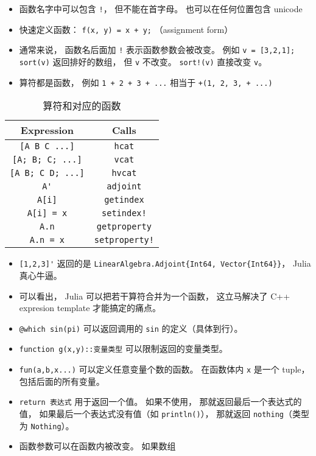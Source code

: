 
\begin{issues}
\issueDraft
\end{issues}

\begin{itemize}
\item 函数名字中可以包含 \verb`!`， 但不能在首字母。 也可以在任何位置包含 unicode
\item 快速定义函数： \verb`f(x, y) = x + y;` （assignment form）
\item 通常来说， 函数名后面加 \verb`!` 表示函数参数会被改变。 例如 \verb`v = [3,2,1]; sort(v)` 返回排好的数组， 但 \verb`v` 不改变。 \verb`sort!(v)` 直接改变 \verb`v`。
\item 算符都是函数， 例如 \verb`1 + 2 + 3 + ...` 相当于 \verb`+(1, 2, 3, + ...)`
\end{itemize}


\begin{table}[ht]
\centering
\caption{算符和对应的函数}\label{tab_JuFunc_1}
\begin{tabular}{|c|c|}
\hline
Expression & Calls \\
\hline
\verb`[A B C ...]` & \verb`hcat` \\
\hline
\verb`[A; B; C; ...]` & \verb`vcat` \\
\hline
\verb`[A B; C D; ...]` & \verb`hvcat` \\
\hline
\verb`A'` & \verb`adjoint` \\
\hline
\verb`A[i]` & \verb`getindex` \\
\hline
\verb`A[i] = x` & \verb`setindex!` \\
\hline
\verb`A.n` & \verb`getproperty` \\
\hline
\verb`A.n = x` & \verb`setproperty!` \\
\hline
\end{tabular}
\end{table}

\begin{itemize}
\item \verb`[1,2,3]'` 返回的是 \verb`LinearAlgebra.Adjoint{Int64, Vector{Int64}}`， Julia 真心牛逼。
\item 可以看出， Julia 可以把若干算符合并为一个函数， 这立马解决了 C++ expresion template 才能搞定的痛点。
\item \verb`@which sin(pi)` 可以返回调用的 \verb`sin` 的定义（具体到行）。
\item \verb`function g(x,y)::变量类型` 可以限制返回的变量类型。
\item \verb`fun(a,b,x...)` 可以定义任意变量个数的函数。 在函数体内 \verb`x` 是一个 tuple， 包括后面的所有变量。
\item \verb`return 表达式` 用于返回一个值。 如果不使用， 那就返回最后一个表达式的值， 如果最后一个表达式没有值（如 \verb`println()`）， 那就返回 \verb`nothing`（类型为 \verb`Nothing`）。
\item 函数参数可以在函数内被改变。 如果数组
\end{itemize}

